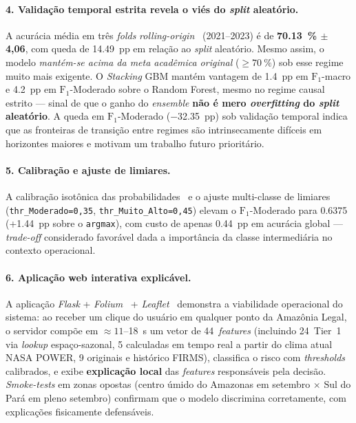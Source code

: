 \paragraph{4. Validação temporal estrita revela o viés do \emph{split} aleatório.} A acurácia média em três \emph{folds} \emph{rolling-origin}~\cite{bergmeir2012cv} (2021--2023) é de \textbf{\SI{70,13}{\percent} \(\pm\) 4,06}, com queda de \SI{14,49}{pp} em relação ao \emph{split} aleatório. Mesmo assim, o modelo \emph{mantém-se acima da meta acadêmica original} (\(\geq \SI{70}{\percent}\)) sob esse regime muito mais exigente. O \emph{Stacking} GBM mantém vantagem de \SI{+1,4}{pp} em \(\text{F}_1\)-macro e \SI{+4,2}{pp} em \(\text{F}_1\)-Moderado sobre o Random Forest, mesmo no regime causal estrito --- sinal de que o ganho do \emph{ensemble} \textbf{não é mero \emph{overfitting} do \emph{split} aleatório}. A queda em \(\text{F}_1\)-Moderado (\SI{-32,35}{pp}) sob validação temporal indica que as fronteiras de transição entre regimes são intrinsecamente difíceis em horizontes maiores e motivam um trabalho futuro prioritário.

\paragraph{5. Calibração e ajuste de limiares.} A calibração isotônica das probabilidades~\cite{zadrozny2002transforming} e o ajuste multi-classe de limiares (\texttt{thr\_Moderado=0,35}, \texttt{thr\_Muito\_Alto=0,45}) elevam o \(\text{F}_1\)-Moderado para \num{0,6375} (+\SI{1,44}{pp} sobre o \texttt{argmax}), com custo de apenas \SI{0,44}{pp} em acurácia global --- \emph{trade-off} considerado favorável dada a importância da classe intermediária no contexto operacional.

\paragraph{6. Aplicação web interativa explicável.} A aplicação \emph{Flask} + \emph{Folium}~\cite{folium} + \emph{Leaflet}~\cite{leafletjs} demonstra a viabilidade operacional do sistema: ao receber um clique do usuário em qualquer ponto da Amazônia Legal, o servidor compõe em \(\approx 11\)--\SI{18}{\second} um vetor de 44~\emph{features} (incluindo 24~Tier~1 via \emph{lookup} espaço-sazonal, 5 calculadas em tempo real a partir do clima atual NASA POWER, 9 originais e histórico FIRMS), classifica o risco com \emph{thresholds} calibrados, e exibe \textbf{explicação local} das \emph{features} responsáveis pela decisão. \emph{Smoke-tests} em zonas opostas (centro úmido do Amazonas em setembro \(\times\) Sul do Pará em pleno setembro) confirmam que o modelo discrimina corretamente, com explicações fisicamente defensáveis.

